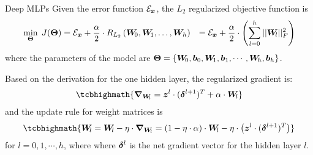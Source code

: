 \begin{frame}{Deep MLPs}
%
Given the error function ${\mathcal E}_{{\boldsymbol x}}$, the $L_2$ regularized objective
function is
\begin{align*}
    \min_{{\bm \Theta}} \; J({\bm \Theta}) & =  {\mathcal E}_{{\boldsymbol x}} + \frac{\alpha}{2} \cdot
    R_{L_2}\left({\boldsymbol W}_{\!0}, {\boldsymbol W}_{\!1}, \ldots, {\boldsymbol W}_{h}\right)
    & = {\mathcal E}_{{\boldsymbol x}} +
    \frac{\alpha}{2} \cdot \left( \sum_{l=0}^h || {\boldsymbol W}_{\!l}||_{F}^2 \right)
\end{align*}
where the parameters of the model are 
${\bm \Theta} = \left\{{\boldsymbol W}_{\!0}, {\boldsymbol b}_{0}, {\boldsymbol W}_{\!1}, {\boldsymbol b}_{1}, \cdots, 
{\boldsymbol W}_{\!h}, {\boldsymbol b}_{h}\right\}$.

\medskip

Based on the derivation for the one hidden layer, the
regularized gradient is:
\begin{align*}
    \tcbhighmath{
        \bgrad_{\bW_{\!l}}  = \bz^{l} \cdot (\bdelta^{l+1})^T + \alpha \cdot
\bW_{\!l}}
\end{align*}
and the update rule for weight matrices is
\begin{align*}
    \tcbhighmath{
    \bW_{\!l} = \bW_{\!l} - \eta \cdot \bgrad_{\bW_{\!l}}
     = (1-\eta\cdot\alpha) \cdot \bW_{\!l} - \eta \cdot \lB(\bz^l \cdot
 (\bdelta^{l+1})^T \rB)}
\end{align*}
for $l=0,1,\cdots,h$, where
where ${\bm \delta}^{l}$ 
is the net gradient vector for the hidden layer $l$.
\end{frame}
